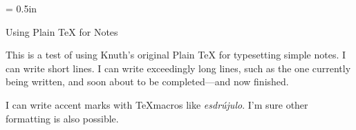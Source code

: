 \parindent = 0.5in

\beginsection Using Plain TeX for Notes

This is a test of using Knuth's original Plain TeX for typesetting simple notes.
I can write short lines.
I can write exceedingly long lines, such as the one currently being written, and soon about to be completed---and now finished.

I can write accent marks with \TeX macros like {\it esdr\'ujulo}.
I'm sure other formatting is also possible.

\bye
